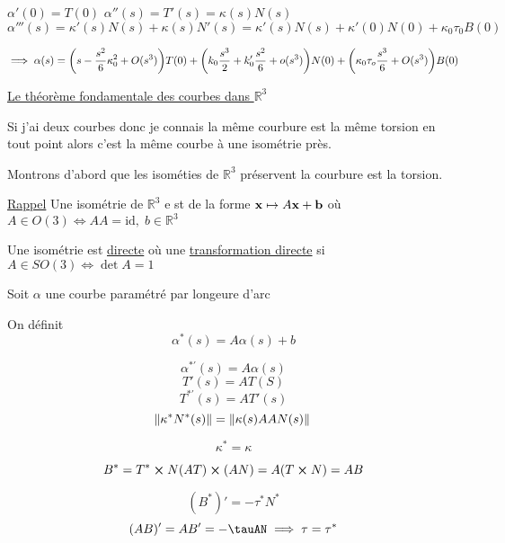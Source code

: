 \documentclass{article}
\begin{document}
$\alpha'(0) = T(0)$
$\alpha''(s)= T'(s) = \kappa(s)N(s)$
$\alpha'''(s) = \kappa'(s)N(s) + \kappa(s)N'(s) = \kappa'(s)N(s)+ \kappa'(0)N(0) + \kappa_0 \tau_0 B(0)$

$$\implies \alpha(s)=\qty(s-\frac{s^2}6\kappa_0^2+O(s^3))T(0) + \qty(k_0\frac{s^3}{2} + k_0' \frac{s^2}6 + o(s^3))N(0) + \qty(\kappa_0\tau_o\frac{s^3}6 + O(s^3))B(0)$$

\underline{Le théorème fondamentale des courbes dans $\mathbb{R}^3$}

Si j'ai deux courbes donc je connais la même courbure est la même torsion en tout point alors c'est la même courbe à une isométrie près.

Montrons d'abord que les isométies de $\mathbb{R}^3$ préservent la courbure est la torsion. 

\underline{Rappel} Une isométrie de $\mathbb{R}^3$ e st de la forme $\vb x \mapsto A \vb x + \vb b$ où $A \in O(3) \iff AA=\text{id}, \; b\in \mathbb{R}^3$

Une isométrie est \underline{directe} où une \underline{transformation directe} si $A \in SO(3) \iff \det A =1$

Soit $\alpha$ une courbe paramétré par longeure d'arc 

On définit $$\alpha^*(s) = A\alpha(s) + b$$

$$\alpha^{*'}(s) = A\alpha(s)$$
$$T'(s) = AT(S)$$
$$T^{*'}(s) = A T'(s)$$
$$\norm{\kappa^*N^*(s)} = \norm*{\kappa(s)AAN(s)}$$

$$\kappa^* = \kappa$$


$$B^* = T^*\cross N (AT)\cross (AN) =A(T\cross N) = A B$$

$$(B^*)' = -\tau^*N^*$$
$$(AB)' = AB' = -\tauAN \implies \tau = \tau^*$$
\end{document}
